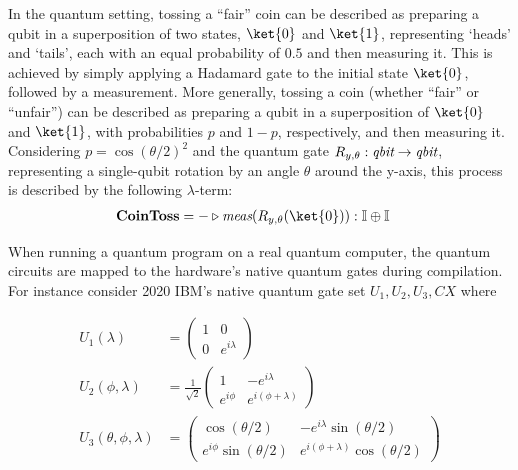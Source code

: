 \begin{example} 
  In the quantum setting, tossing a ``fair'' coin can be described as preparing a qubit in a superposition of two states, $\ket{0}$ and $\ket{1}$, representing `heads' and `tails', each with an equal probability of $0.5$ and then measuring it. This is achieved by simply applying a Hadamard gate to the initial state $\ket{0}$, followed by a measurement.
More generally, tossing a coin (whether ``fair'' or ``unfair'') can be described as preparing a qubit in a superposition of  $\ket{0}$ and $\ket{1}$, with probabilities $p$ and $1-p$, respectively,  and then measuring it.  Considering $p= \cos(\theta/2)^2$ and the quantum gate $R_{y,\theta} : \emph{qbit} \to \emph{qbit}$, representing a single-qubit rotation by an angle \( \theta \) around the y-axis,  this process is described by the following $\lambda$-term:
\begin{align*}
  &\textbf{CoinToss} = - \vljud \emph{meas} (R_{y,\theta} (\ket{0})): \typeI \oplus \typeI
\end{align*}

When running a quantum program on a real quantum computer, the quantum circuits are mapped to the hardware's native quantum gates during compilation. For instance consider 2020 IBM's native quantum gate set $U_1,U_2,U_3,CX$ where

  \begin{align*}
    U_1(\lambda) &= 
    \begin{pmatrix}
        1 & 0 \\
        0 & e^{i\lambda}
    \end{pmatrix} \\
    U_2(\phi, \lambda) &= 
    \frac{1}{\sqrt{2}}
    \begin{pmatrix}
        1 & -e^{i\lambda} \\
        e^{i\phi} & e^{i(\phi+\lambda)}
    \end{pmatrix} \\
    U_3(\theta, \phi, \lambda) &= 
    \begin{pmatrix}
        \cos(\theta/2) & -e^{i\lambda}\sin(\theta/2) \\
        e^{i\phi}\sin(\theta/2) & e^{i(\phi+\lambda)}\cos(\theta/2)
    \end{pmatrix} \\
\end{align*}


\end{example}
